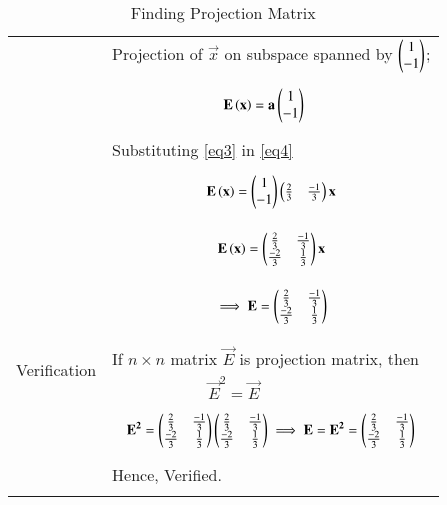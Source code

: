 \documentclass[journal,12pt]{IEEEtran}
\begin{document}
\begin{longtable}{|p{4cm}|p{14cm}|}
     & Projection of $\vec{x}$ on subspace spanned by $\begin{pmatrix}1\\-1\end{pmatrix}$;\\
     &
     {\begin{align}\label{eq4}
     & \mathbf{E}\left(\mathbf{x}\right) = \mathbf{a}\begin{pmatrix}1\\-1\end{pmatrix}
     \end{align}}\\
     & Substituting \eqref{eq3} in \eqref{eq4}\\
     &
     {\begin{align}
       \mathbf{E}\left(\mathbf{x}\right) = \begin{pmatrix}1\\-1\end{pmatrix}\begin{pmatrix}\frac{2}{3}& \frac{-1}{3}\end{pmatrix}\mathbf{x}
       \end{align}}\\
       &{\begin{align}
     \mathbf{E}\left(\mathbf{x}\right) = \begin{pmatrix}\frac{2}{3}&\frac{-1}{3}\\\frac{-2}{3}&\frac{1}{3}\end{pmatrix}\mathbf{x}
      \end{align}}\\
      &{\begin{align}
      \implies{ \mathbf{E}= \ensuremath{\begin{pmatrix}\frac{2}{3}&\frac{-1}{3}\\\frac{-2}{3}& \frac{1}{3}\end{pmatrix}}}
      \end{align}}\\
       \hline
       \multirow{3}{*}{Verification} & \\
& If $n\times n$ matrix $\vec{E}$ is projection matrix, then\\
	&$\qquad\qquad\qquad \vec{E}^2=\vec{E}$\\
  &{\begin{align}
  \mathbf{E^{2}} = \begin{pmatrix}\frac{2}{3}&\frac{-1}{3}\\\frac{-2}{3}& \frac{1}{3}\end{pmatrix}\begin{pmatrix}\frac{2}{3}&\frac{-1}{3}\\\frac{-2}{3}& \frac{1}{3}\end{pmatrix}
  \implies \mathbf{E}=\mathbf{E^{2}}=\begin{pmatrix}\frac{2}{3}&\frac{-1}{3}\\\frac{-2}{3}& \frac{1}{3}\end{pmatrix}
  \end{align}}\\
  & Hence, Verified.\\
  \hline
\caption{Finding Projection Matrix}
\label{table:1}	
\end{longtable}
\end{document}
